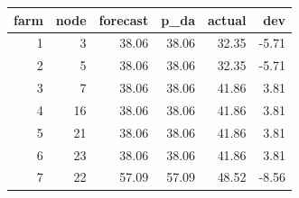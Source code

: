 \begin{tabular}{rrrrrr}
\toprule
farm & node & forecast & p\_da & actual & dev \\
\midrule
1 & 3 & 38.06 & 38.06 & 32.35 & -5.71 \\
2 & 5 & 38.06 & 38.06 & 32.35 & -5.71 \\
3 & 7 & 38.06 & 38.06 & 41.86 & 3.81 \\
4 & 16 & 38.06 & 38.06 & 41.86 & 3.81 \\
5 & 21 & 38.06 & 38.06 & 41.86 & 3.81 \\
6 & 23 & 38.06 & 38.06 & 41.86 & 3.81 \\
7 & 22 & 57.09 & 57.09 & 48.52 & -8.56 \\
\bottomrule
\end{tabular}
